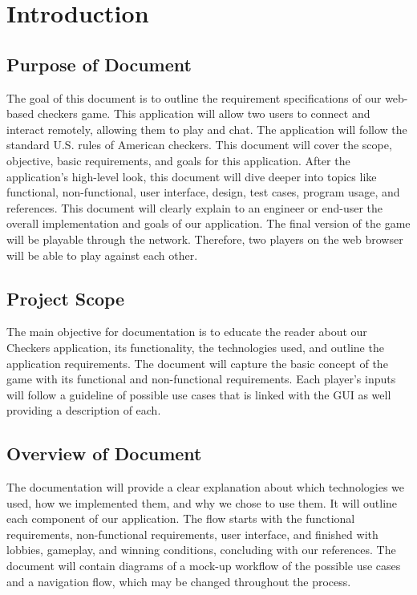 \documentclass[10pt]{article}
\begin{document}
\section{Introduction}

\subsection{Purpose of Document}
The goal of this document is to outline the requirement specifications of our web-based checkers game. 
This application will allow two users to connect and interact remotely, allowing them to play and chat.
The application will follow the standard U.S. rules of American checkers. 
This document will cover the scope, objective, basic requirements, and goals for this application. 
After the application's high-level look, this document will dive deeper into topics like functional, 
non-functional, user interface, design, test cases, program usage, and references. 
This document will clearly explain to an engineer or end-user the overall implementation 
and goals of our application. The final version of the game will be playable through the network. Therefore, 
two players on the web browser will be able to play against each other.

\subsection{Project Scope}
The main objective for documentation is to educate the reader about our Checkers application, 
its functionality, the technologies used, and outline the application requirements.
The document will capture the basic concept of the game with its functional and non-functional requirements. 
Each player’s inputs will follow a guideline of possible use cases that is linked with the GUI as well providing a description of each.

\subsection{Overview of Document}
The documentation will provide a clear explanation about which technologies we used, 
how we implemented them, and why we chose to use them. It will outline each component 
of our application. The flow starts with the functional requirements, non-functional requirements, 
user interface, and finished with lobbies, gameplay, and winning conditions, concluding with our references.
The document will contain diagrams of a mock-up workflow of the possible use cases and a navigation flow, which may be changed throughout the process. 
\end{document}
